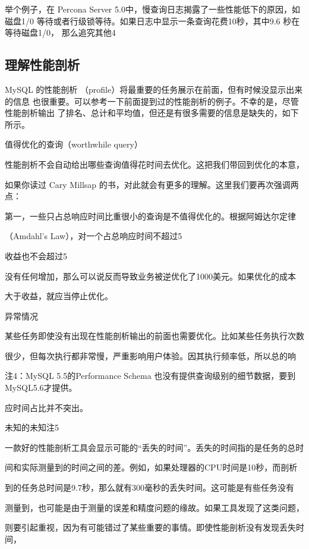 举个例子，在 Percona Server 5.0中，慢查询日志揭露了一些性能低下的原因，如磁盘1/0
等待或者行级锁等待。如果日志中显示一条查询花费10秒，其中9.6 秒在等待磁盘1/0，
那么追究其他4%

\subsection{理解性能剖析}
MySQL 的性能剖析 （profile）将最重要的任务展示在前面，但有时候没显示出来的信息
也很重要。可以参考一下前面提到过的性能剖析的例子。不幸的是，尽管性能剖析输出
了排名、总计和平均值，但还是有很多需要的信息是缺失的，如下所示。

值得优化的查询（worthwhile query）

性能剖析不会自动给出哪些查询值得花时间去优化。这把我们带回到优化的本意，

如果你读过 Cary Millsap 的书，对此就会有更多的理解。这里我们要再次强调两点：

第一，一些只占总响应时间比重很小的查询是不值得优化的。根据阿姆达尔定律

（Amdahl's Law），对一个占总响应时间不超过5%

收益也不会超过5%

没有任何增加，那么可以说反而导致业务被逆优化了1000美元。如果优化的成本

大于收益，就应当停止优化。

异常情况

某些任务即使没有出现在性能剖析输出的前面也需要优化。比如某些任务执行次数

很少，但每次执行都非常慢，严重影响用户体验。因其执行频率低，所以总的响

注4：MySQL 5.5的Performance Schema 也没有提供查询级别的细节数据，要到MySQL5.6才提供。

应时间占比并不突出。

未知的未知注5

一款好的性能剖析工具会显示可能的“丢失的时间”。丢失的时间指的是任务的总时

间和实际测量到的时间之间的差。例如，如果处理器的CPU时间是10秒，而剖析

到的任务总时间是9.7秒，那么就有300毫秒的丢失时间。这可能是有些任务没有

测量到，也可能是由于测量的误差和精度问题的缘故。如果工具发现了这类问题，

则要引起重视，因为有可能错过了某些重要的事情。即使性能剖析没有发现丢失时间，

